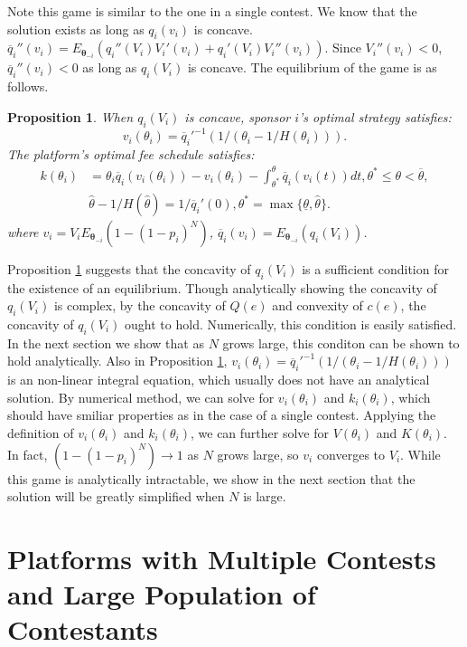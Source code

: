 \documentclass[12pt]{article}
\newtheorem{Proposition}{Proposition}
\begin{document}
Note this game is similar to the one in a single contest. We know that the solution exists as long as ${q}_{i}(v_{i})$ is concave.
$\overline{q}_{i}''(v_{i})=E_{\boldsymbol{\theta}_{-i}}(q_{i}''(V_{i})V_{i}'(v_{i})+q_{i}'(V_{i})V_{i}''(v_{i}))$.
Since $V_{i}''(v_{i})<0$, $\overline{q}_{i}''(v_{i})<0$ as long
as $q_{i}(V_{i})$ is concave. The equilibrium of the game is as follows.

\begin{Proposition} \label{TV_solution}  When $q_{i}(V_{i})$ is concave, sponsor $i$'s optimal strategy satisfies:
$$v_{i}(\theta_{i})  =\overline{q}_{i}'^{-1}(1/(\theta_{i}-1/H(\theta_{i}))).$$
The platform's optimal fee schedule satisfies:
\begin{align*}
k(\theta_{i}) & =\theta_{i}\overline{q}_{i}(v_{i}(\theta_{i}))-v_{i}(\theta_{i})-\int_{\theta^{*}}^{\theta}\overline{q}_{i}(v_{i}(t))dt, \theta^{*} \leq\theta<\overline{\theta},\\
& \hat{\theta}-1/H(\hat{\theta})=1/\overline{q}_{i}'(0),\theta^{*}=\max\{\underline{\theta},\hat{\theta}\}.
\end{align*}
where $v_{i}=V_{i}E_{\boldsymbol{\theta}_{-i}}(1-(1-p_{i})^{N})$, $\overline{q}_{i}(v_{i})=E_{\boldsymbol{\theta}_{-i}}(q_{i}(V_{i}))$.
\end{Proposition}

Proposition \ref{TV_solution} suggests that  the concavity of $q_{i}(V_{i})$ is a sufficient condition for the existence of an equilibrium. Though analytically showing the concavity of $q_{i}(V_{i})$ is complex, by the concavity of $Q(e)$ and convexity of $c(e)$, the concavity of $q_{i}(V_{i})$ ought to hold. Numerically,
this condition is easily satisfied. In the next section we show that as $N$
grows large, this conditon can be shown to hold analytically. Also in Proposition \ref{TV_solution},
$v_{i}(\theta_{i})=\overline{q}_{i}'^{-1}(1/(\theta_{i}-1/H(\theta_{i})))$
is an non-linear integral equation, which usually does not have an
analytical solution. By numerical method, we can solve for $v_{i}(\theta_{i})$
and $k_{i}(\theta_{i})$, which should have smiliar properties
as in the case of a single contest. Applying the definition of $v_{i}(\theta_{i})$
and $k_{i}(\theta_{i})$, we can further solve for $V(\theta_{i})$
and $K(\theta_{i})$. In fact, $(1-(1-p_{i})^{N})\to1$ as $N$ grows
large, so $v_{i}$ converges to $V_{i}$. While this game is analytically intractable, we show in the next section
that the solution will be greatly simplified when $N$ is large.


\section{Platforms with Multiple Contests and Large Population of Contestants}
\end{document}
